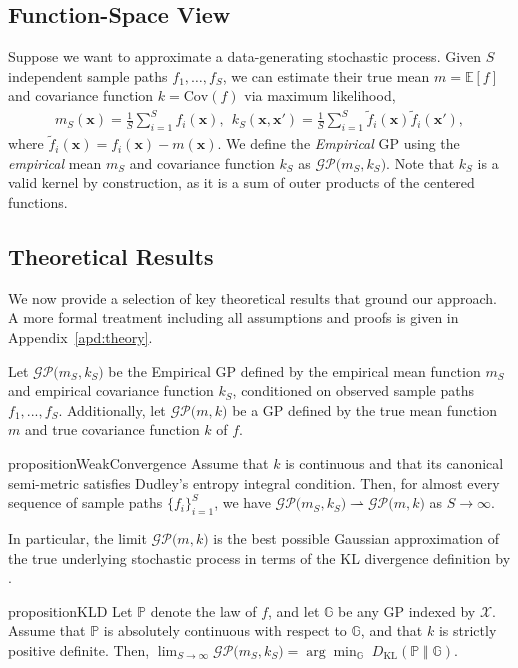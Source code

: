 \documentclass{article}
\newcommand{\K}{S}
\newcommand{\domain}{\mathcal{X}}
\newcommand{\vx}{\mathbf{x}}
\newcommand{\sample}{f}
\newcommand{\stochprocess}{f}
\begin{document}
\subsection{Function-Space View}
\label{subsec:egps:general}
Suppose we want to approximate a data-generating stochastic process.
Given $\K$ independent sample paths $f_1, \ldots, f_\K$,
we can estimate their true mean $m = \mathbb{E}[f]$ and covariance function $k = \mathrm{Cov}(f)$ via maximum likelihood,
\begin{equation}
\label{eq:empirical_mean_and_kernel}
   \begin{aligned}
        m_\K(\mathbf{x}) = \frac{1}{\K} \sum_{i=1}^{\K} f_i(\mathbf{x}), \ \
        k_\K(\mathbf{x}, \mathbf{x}') = \frac{1}{\K} \sum_{i=1}^{\K}
         \tilde \sample_i(\vx) \tilde \sample_i(\vx'),
    \end{aligned}
\end{equation}
where $\tilde \sample_i(\vx) = f_i(\vx) - m(\vx)$.
We define the \emph{Empirical} GP using the \emph{empirical} mean $m_S$ and covariance function $k_S$ as $\mathcal{GP}\bigl(m_\K, k_\K\bigr)$.
Note that $k_\K$ is a valid kernel by construction, as it is a sum of outer products of the centered functions.

\subsection{Theoretical Results}
\label{subsec:egp:theory}

We now provide a selection of key theoretical results that ground our approach.
A more formal treatment including all assumptions and proofs is given in Appendix~\ref{apd:theory}.

Let $\mathcal{GP}\bigl(m_\K, k_\K\bigr)$ be the Empirical GP defined by the empirical mean function $m_\K$ and empirical covariance function $k_\K$, conditioned on observed sample paths $f_1, ..., f_\K$.
Additionally, let $\mathcal{GP}\bigl(m, k)$ be a GP defined by the true mean function $m$ and true covariance function $k$ of $\stochprocess$.
\begin{restatable}{proposition}{WeakConvergence}
\label{thm:weak_convergence}
Assume that $k$ is continuous and that its canonical semi-metric satisfies Dudley's entropy integral condition.
Then, for almost every sequence of sample paths $\{ f_i \}_{i=1}^\K$, we have $\mathcal{GP}\bigl(m_\K, k_\K\bigr) \rightharpoonup \mathcal{GP}\bigl(m, k)$ as $\K \to \infty$.
\end{restatable}
In particular, the limit $\mathcal{GP}\bigl(m, k)$ is the best possible Gaussian approximation of the true underlying stochastic process in terms of the KL divergence definition by \citet{sun2019functional}.
\begin{restatable}{proposition}{KLD}
\label{thm:kl_divergence}
Let $\mathbb{P}$ denote the law of $f$, and let $\mathbb{G}$ be any GP indexed by $\domain$.
Assume that $\mathbb{P}$ is absolutely continuous with respect to $\mathbb{G}$, and that $k$ is strictly positive definite.
Then,
$\lim_{\K \to \infty} \mathcal{GP}\bigl(m_\K, k_\K\bigr) = \arg\! \min_\mathbb{G} \; D_{\mathrm{KL}} ( \mathbb{P} \;\Vert\; \mathbb{G})$.
\end{restatable}
\end{document}
